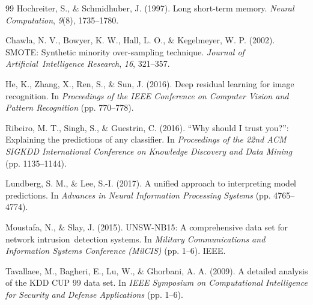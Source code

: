 \documentclass[sensors,apajournal,article,submit,moreauthors]{Definitions/mdpi}
\begin{document}
\begin{thebibliography}{99}
Hochreiter, S., \& Schmidhuber, J. (1997). Long short-term memory. \textit{Neural Computation}, \textit{9}(8), 1735--1780.

Chawla, N. V., Bowyer, K. W., Hall, L. O., \& Kegelmeyer, W. P. (2002). SMOTE: Synthetic minority over-sampling technique. \textit{Journal of \mbox{Artificial Intelligence} Research}, \textit{16}, 321--357.

He, K., Zhang, X., Ren, S., \& Sun, J. (2016). Deep residual learning for image recognition. In \textit{Proceedings of the IEEE Conference on Computer Vision and Pattern Recognition} (pp. 770--778).

Ribeiro, M. T., Singh, S., \& Guestrin, C. (2016). ``Why should I trust you?'': Explaining the predictions of any classifier. In \textit{Proceedings of the 22nd ACM SIGKDD International Conference on Knowledge Discovery and Data Mining} (pp. 1135--1144).

Lundberg, S. M., \& Lee, S.-I. (2017). A unified approach to interpreting model predictions. In \textit{Advances in Neural Information Processing Systems} (pp. 4765--4774).



Moustafa, N., \& Slay, J. (2015). UNSW-NB15: A comprehensive data set for network \mbox{intrusion detection} systems. In \textit{Military Communications and Information Systems Conference (MilCIS)} (pp. 1--6). IEEE.

Tavallaee, M., Bagheri, E., Lu, W., \& Ghorbani, A. A. (2009). A detailed analysis of the KDD CUP 99 data set. In \textit{IEEE Symposium on Computational Intelligence for Security and Defense Applications} (pp. 1--6).

\end{thebibliography}

\PublishersNote{}
\end{document}
